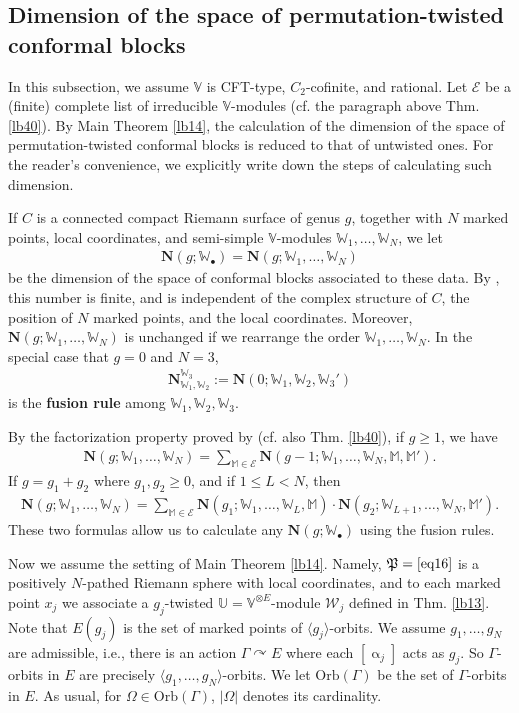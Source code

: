 \documentclass[11pt,b5paper,notitlepage]{article}
\theoremstyle{definition}
\theoremstyle{plain}
\newcommand{\fk}{\mathfrak}
\newcommand{\mc}{\mathcal}
\newcommand{\bk}[1]{\langle {#1}\rangle}
\newcommand{\blt}{\bullet}
\newcommand{\Vbb}{\mathbb V}
\newcommand{\Ubb}{\mathbb U}
\newcommand{\Wbb}{\mathbb W}
\newcommand{\Mbb}{\mathbb M}
\newcommand{\Nbf}{\mathbf N}
\newcommand{\Orb}{\mathrm{Orb}}
\numberwithin{equation}{subsection}
\begin{document}
\begin{subappendices}
\subsection{Dimension of the space of permutation-twisted conformal blocks}\label{lb58}

In this subsection, we assume $\Vbb$ is CFT-type, $C_2$-cofinite, and rational. Let $\mc E$ be a (finite) complete list of irreducible $\Vbb$-modules (cf. the paragraph above Thm. \ref{lb40}). By Main Theorem \ref{lb14}, the calculation of the dimension of the space of permutation-twisted conformal blocks is reduced to that of untwisted ones. For the reader's convenience, we explicitly write down the steps of calculating such dimension.



If $C$ is a connected compact Riemann surface of genus $g$, together with $N$ marked points, local coordinates, and semi-simple  $\Vbb$-modules $\Wbb_1,\dots,\Wbb_N$, we let
\begin{align*}
\Nbf(g;\Wbb_\blt)=\Nbf(g;\Wbb_1,\dots,\Wbb_N)	 
\end{align*}
be the dimension of the space of conformal blocks associated to these data. By \cite{DGT21,DGT22}, this number is finite, and  is independent of the complex structure of $C$, the position of $N$ marked points, and the local coordinates. Moreover, $\Nbf(g;\Wbb_1,\dots,\Wbb_N)$ is unchanged if we rearrange the order $\Wbb_1,\dots,\Wbb_N$. In the special case that $g=0$ and $N=3$,
\begin{align*}
\Nbf_{\Wbb_1,\Wbb_2}^{\Wbb_3}:=\Nbf(0;\Wbb_1,\Wbb_2,\Wbb_3')	
\end{align*}
is the \textbf{fusion rule} among $\Wbb_1,\Wbb_2,\Wbb_3$.

By the factorization property proved by \cite{DGT22} (cf. also Thm. \ref{lb40}), if $g\geq 1$, we have
\begin{align}
\Nbf(g;\Wbb_1,\dots,\Wbb_N)=\sum_{\Mbb\in\mc E}\Nbf(g-1;\Wbb_1,\dots,\Wbb_N,\Mbb,\Mbb').	
\end{align}
If $g=g_1+g_2$ where $g_1,g_2\geq 0$, and if $1\leq L<N$, then
\begin{align}
\Nbf(g;\Wbb_1,\dots,\Wbb_N)=\sum_{\Mbb\in\mc E}\Nbf(g_1;\Wbb_1,\dots,\Wbb_L,\Mbb)\cdot\Nbf(g_2;\Wbb_{L+1},\dots,\Wbb_N,\Mbb').	
\end{align}	
These two formulas allow us to calculate any $\Nbf(g;\Wbb_\blt)$ using the fusion rules.


Now we assume the setting of Main Theorem \ref{lb14}. Namely, $\fk P=\eqref{eq16}$ is a positively  $N$-pathed Riemann sphere with local coordinates, and to each marked point $x_j$ we associate a $g_j$-twisted  $\Ubb=\Vbb^{\otimes E}$-module $\mc W_j$ defined in Thm. \ref{lb13}. Note that $E(g_j)$ is the set of marked points of $\bk{g_j}$-orbits. We assume $g_1,\dots,g_N$ are admissible, i.e., there is an action $\Gamma\curvearrowright E$ where each $[\upalpha_j]$ acts as $g_j$. So $\Gamma$-orbits in $E$ are precisely $\bk{g_1,\dots,g_N}$-orbits. We let $\Orb(\Gamma)$ be the set of $\Gamma$-orbits in $E$. As usual, for $\Omega\in\Orb(\Gamma)$, $|\Omega|$ denotes its cardinality.




\end{subappendices}
\end{document}
